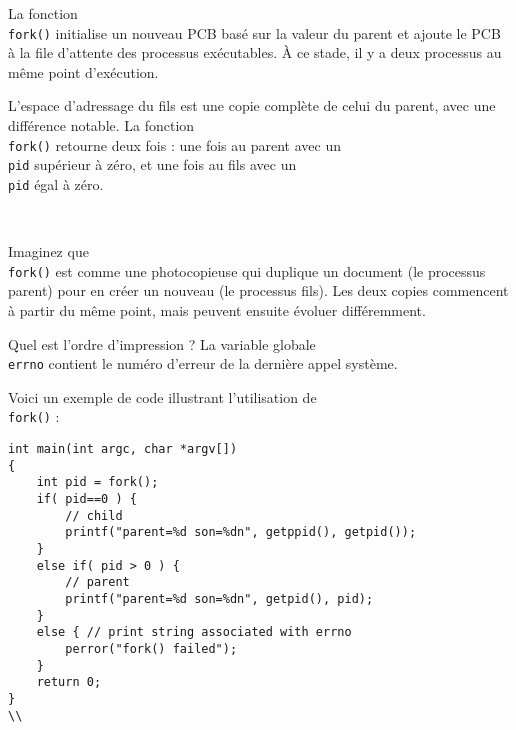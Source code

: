 \documentclass[12pt]{article}
\begin{document}
La fonction \\\texttt{fork()} initialise un nouveau PCB basé sur la valeur du parent et ajoute le PCB à la file d'attente des processus exécutables. À ce stade, il y a deux processus au même point d'exécution.

L'espace d'adressage du fils est une copie complète de celui du parent, avec une différence notable. La fonction \\\texttt{fork()} retourne deux fois : une fois au parent avec un \\\texttt{pid} supérieur à zéro, et une fois au fils avec un \\\texttt{pid} égal à zéro.

\\\begin{tcolorbox}[title={Vulgarisation simple}]
Imaginez que \\\texttt{fork()} est comme une photocopieuse qui duplique un document (le processus parent) pour en créer un nouveau (le processus fils). Les deux copies commencent à partir du même point, mais peuvent ensuite évoluer différemment.
\\\end{tcolorbox}

Quel est l'ordre d'impression ? La variable globale \\\texttt{errno} contient le numéro d'erreur de la dernière appel système.

Voici un exemple de code illustrant l'utilisation de \\\texttt{fork()} :
\\\begin{lstlisting}
int main(int argc, char *argv[])
{
    int pid = fork();
    if( pid==0 ) {
        // child
        printf("parent=%d son=%dn", getppid(), getpid());
    }
    else if( pid > 0 ) {
        // parent
        printf("parent=%d son=%dn", getpid(), pid);
    }
    else { // print string associated with errno
        perror("fork() failed");
    }
    return 0;
}
\\\end{lstlisting}

\\
\end{document}
